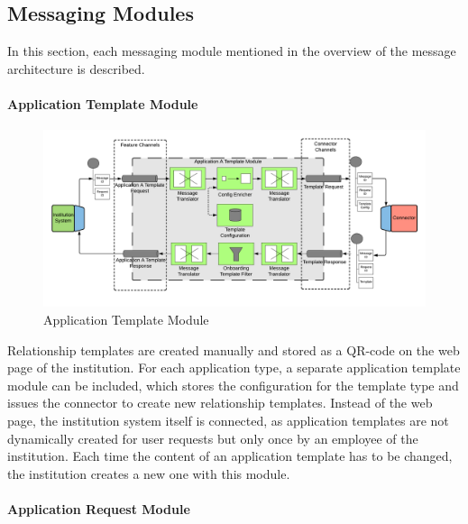 \subsection{Messaging Modules}

In this section, each messaging module mentioned in the overview of the message architecture is described.

\paragraph{Application Template Module}

\begin{figure}[H]
    \centering
    \includegraphics[scale=0.6]{Diagrams/Integration Architecture 2/Technological Integration/4. Application Template Module.pdf}
    \caption{Application Template Module}
    \label{integration2:application_template_module}
\end{figure}

Relationship templates are created manually and stored as a QR-code on the web page of the institution. For each application type, a separate application template module can be included, which stores the configuration for the template type and issues the connector to create new relationship templates. Instead of the web page, the institution system itself is connected, as application templates are not dynamically created for user requests but only once by an employee of the institution. Each time the content of an application template has to be changed, the institution creates a new one with this module.

\paragraph{Application Request Module}

